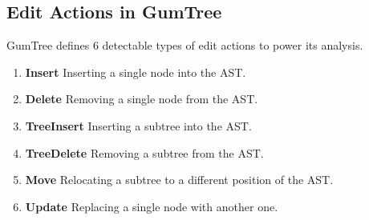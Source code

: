 \subsection{Edit Actions in GumTree}

GumTree defines 6 detectable types of edit actions to power its analysis.

\begin{enumerate}
	\item \textbf{Insert} Inserting a single node into the AST.
	\item \textbf{Delete} Removing a single node from the AST.
	\item \textbf{TreeInsert} Inserting a subtree into the AST.
	\item \textbf{TreeDelete} Removing a subtree from the AST.
	\item \textbf{Move} Relocating a subtree to a different position of the AST.
	\item \textbf{Update} Replacing a single node with another one.
\end{enumerate}

